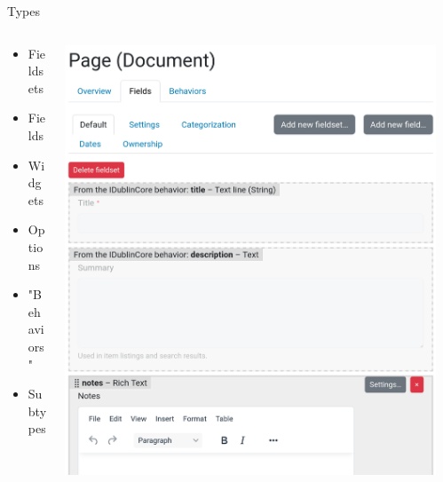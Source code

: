 \documentclass[12pt,aspectratio=169]{beamer}
\begin{document}
\begin{frame}{Types}
  \begin{columns}
    \begin{column}{0.3\textwidth}
      \begin{itemize}
        \item Fieldsets
        \item Fields
        \item Widgets
        \item Options
        \item "Behaviors"
        \item Subtypes
      \end{itemize}
    \end{column}
    \begin{column}{0.35\textwidth}
      \centering
      \includegraphics[width=0.95\columnwidth]{images/dexterity-01.png}
    \end{column}
    \begin{column}{0.35\textwidth}
      \centering

\end{column}
\end{columns}
\end{frame}
\end{document}

